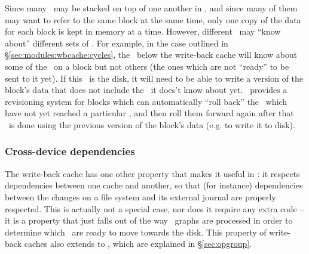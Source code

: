 Since many \modules\ may be stacked on top of one another in \Kudos, and since
many of them may want to refer to the same block at the same time, only one copy
of the data for each block is kept in memory at a time. However, different
\modules\ may ``know about'' different sets of \chdescs. For example, in the
case outlined in \S\ref{sec:modules:wbcache:cycles}, the \module\ below the
write-back cache will know about some of the \chdescs\ on a block but not others
(the ones which are not ``ready'' to be sent to it yet). If this \module\ is the
disk, it will need to be able to write a version of the block's data that does
not include the \chdescs\ it does't know about yet. \Kudos\ provides a
revisioning system for blocks which can automatically ``roll back'' the
\chdescs\ which have not yet reached a particular \module, and then roll them
forward again after that \module\ is done using the previous version of the
block's data (e.g. to write it to disk).

\subsubsection{Cross-device dependencies}

The write-back cache has one other property that makes it useful in \Kudos: it
respects dependencies between one cache and another, so that (for instance)
dependencies between the changes on a file system and its external journal are
properly respected. This is actually not a special case, nor does it require any
extra code -- it is a property that just falls out of the way \chdesc\ graphs
are processed in order to determine which \chdescs\ are ready to move towards
the disk. This property of write-back caches also extends to \opgroups, which
are explained in \S\ref{sec:opgroup}.
